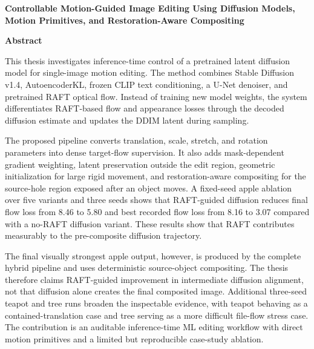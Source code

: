 \documentclass{article}
\begin{document}
\pagestyle{empty}
\thispagestyle{empty}

\begin{center}
    {\LARGE \bf Controllable Motion-Guided Image Editing Using Diffusion Models, Motion Primitives, and Restoration-Aware Compositing}
\end{center}

\vspace{0.2in}
{\bf \noindent Abstract}\\
\vspace{-0.1in}

\noindent This thesis investigates inference-time control of a pretrained latent diffusion model for single-image motion editing. The method combines Stable Diffusion v1.4, AutoencoderKL, frozen CLIP text conditioning, a U-Net denoiser, and pretrained RAFT optical flow. Instead of training new model weights, the system differentiates RAFT-based flow and appearance losses through the decoded diffusion estimate and updates the DDIM latent during sampling.

The proposed pipeline converts translation, scale, stretch, and rotation parameters into dense target-flow supervision. It also adds mask-dependent gradient weighting, latent preservation outside the edit region, geometric initialization for large rigid movement, and restoration-aware compositing for the source-hole region exposed after an object moves. A fixed-seed apple ablation over five variants and three seeds shows that RAFT-guided diffusion reduces final flow loss from 8.46 to 5.80 and best recorded flow loss from 8.16 to 3.07 compared with a no-RAFT diffusion variant. These results show that RAFT contributes measurably to the pre-composite diffusion trajectory.

The final visually strongest apple output, however, is produced by the complete hybrid pipeline and uses deterministic source-object compositing. The thesis therefore claims RAFT-guided improvement in intermediate diffusion alignment, not that diffusion alone creates the final composited image. Additional three-seed teapot and tree runs broaden the inspectable evidence, with teapot behaving as a contained-translation case and tree serving as a more difficult file-flow stress case. The contribution is an auditable inference-time ML editing workflow with direct motion primitives and a limited but reproducible case-study ablation.
\end{document}
